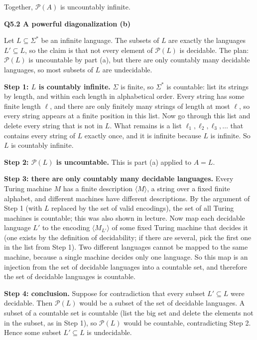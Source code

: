 \documentclass[11pt]{article}
\newcommand{\inner}[1]{\langle #1 \rangle}
\newcommand{\PS}{\mathcal{P}}
\newcommand{\qpage}[1]{\clearpage\noindent\textbf{\large #1}\par\medskip}
\begin{document}
Together, $\PS(A)$ is uncountably infinite.

\qpage{Q5.2 A powerful diagonalization (b)}

Let $L \subseteq \Sigma^*$ be an infinite language.
The subsets of $L$ are exactly the languages $L' \subseteq L$, so the claim is that not every element of $\PS(L)$ is decidable.
The plan: $\PS(L)$ is uncountable by part (a), but there are only countably many decidable languages, so most subsets of $L$ are undecidable.

\textbf{Step 1: $L$ is countably infinite.}
$\Sigma$ is finite, so $\Sigma^*$ is countable: list its strings by length, and within each length in alphabetical order.
Every string has some finite length $\ell$, and there are only finitely many strings of length at most $\ell$, so every string appears at a finite position in this list.
Now go through this list and delete every string that is not in $L$.
What remains is a list $\ell_1, \ell_2, \ell_3, \ldots$ that contains every string of $L$ exactly once, and it is infinite because $L$ is infinite.
So $L$ is countably infinite.

\textbf{Step 2: $\PS(L)$ is uncountable.}
This is part (a) applied to $A = L$.

\textbf{Step 3: there are only countably many decidable languages.}
Every Turing machine $M$ has a finite description $\inner{M}$, a string over a fixed finite alphabet, and different machines have different descriptions.
By the argument of Step 1 (with $L$ replaced by the set of valid encodings), the set of all Turing machines is countable; this was also shown in lecture.
Now map each decidable language $L'$ to the encoding $\inner{M_{L'}}$ of some fixed Turing machine that decides it (one exists by the definition of decidability; if there are several, pick the first one in the list from Step 1).
Two different languages cannot be mapped to the same machine, because a single machine decides only one language.
So this map is an injection from the set of decidable languages into a countable set, and therefore the set of decidable languages is countable.

\textbf{Step 4: conclusion.}
Suppose for contradiction that every subset $L' \subseteq L$ were decidable.
Then $\PS(L)$ would be a subset of the set of decidable languages.
A subset of a countable set is countable (list the big set and delete the elements not in the subset, as in Step 1), so $\PS(L)$ would be countable, contradicting Step 2.
Hence some subset $L' \subseteq L$ is undecidable.
\end{document}
